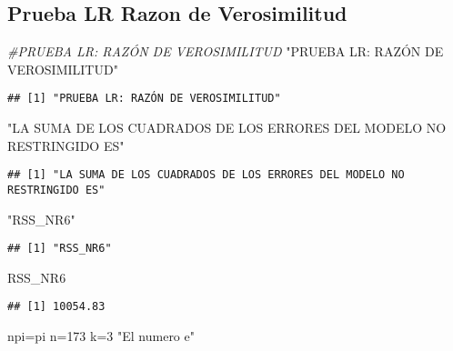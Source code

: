 \documentclass[
]{article}
\newenvironment{Shaded}{\begin{snugshade}}{\end{snugshade}}
\newcommand{\CommentTok}[1]{\textcolor[rgb]{0.56,0.35,0.01}{\textit{#1}}}
\newcommand{\DecValTok}[1]{\textcolor[rgb]{0.00,0.00,0.81}{#1}}
\newcommand{\NormalTok}[1]{#1}
\newcommand{\StringTok}[1]{\textcolor[rgb]{0.31,0.60,0.02}{#1}}
\begin{document}
\hypertarget{prueba-lr-razon-de-verosimilitud}{%
\subsection{Prueba LR Razon de
Verosimilitud}\label{prueba-lr-razon-de-verosimilitud}}

\begin{Shaded}
\begin{Highlighting}[]
\CommentTok{#PRUEBA LR: RAZÓN DE VEROSIMILITUD}
\StringTok{"PRUEBA LR: RAZÓN DE VEROSIMILITUD"}
\end{Highlighting}
\end{Shaded}

\begin{verbatim}
## [1] "PRUEBA LR: RAZÓN DE VEROSIMILITUD"
\end{verbatim}

\begin{Shaded}
\begin{Highlighting}[]
\StringTok{"LA SUMA DE LOS CUADRADOS DE LOS ERRORES DEL MODELO NO RESTRINGIDO ES"}
\end{Highlighting}
\end{Shaded}

\begin{verbatim}
## [1] "LA SUMA DE LOS CUADRADOS DE LOS ERRORES DEL MODELO NO RESTRINGIDO ES"
\end{verbatim}

\begin{Shaded}
\begin{Highlighting}[]
\StringTok{"RSS_NR6"}
\end{Highlighting}
\end{Shaded}

\begin{verbatim}
## [1] "RSS_NR6"
\end{verbatim}

\begin{Shaded}
\begin{Highlighting}[]
\NormalTok{RSS_NR6}
\end{Highlighting}
\end{Shaded}

\begin{verbatim}
## [1] 10054.83
\end{verbatim}

\begin{Shaded}
\begin{Highlighting}[]
\NormalTok{npi=pi}
\NormalTok{n=}\DecValTok{173}
\NormalTok{k=}\DecValTok{3}
\StringTok{"El numero e"}
\end{Highlighting}
\end{Shaded}
\end{document}
